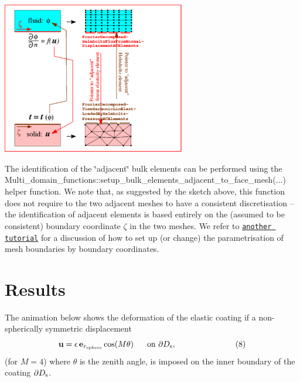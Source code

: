  
\begin{DoxyImage}
\includegraphics[width=0.6\textwidth]{multi_physics}
\end{DoxyImage}


The identification of the \char`\"{}adjacent\char`\"{} bulk elements can be performed using the {\ttfamily Multi\+\_\+domain\+\_\+functions\+::setup\+\_\+bulk\+\_\+elements\+\_\+adjacent\+\_\+to\+\_\+face\+\_\+mesh}(...) helper function. We note that, as suggested by the sketch above, this function does not require to the two adjacent meshes to have a consistent discretisation -- the identification of adjacent elements is based entirely on the (assumed to be consistent) boundary coordinate $ \zeta $ in the two meshes. We refer to \href{../../../poisson/fish_poisson2/html/index.html#boundary_coords}{\tt another tutorial} for a discussion of how to set up (or change) the parametrisation of mesh boundaries by boundary coordinates.



 

\hypertarget{index_results}{}\section{Results}\label{index_results}
The animation below shows the deformation of the elastic coating if a non-\/spherically symmetric displacement \[ \mbox{\bf u} = \epsilon \, \mbox{\bf e}_{r_{\rm sphere}} \cos (M\theta) \mbox{\ \ \ \ \ on $\partial D_{\rm s}$}, \ \ \ \ \ \ \ \ \ \ \ \ \ \ \ \ \ \ \ \ \ \ (8) \] (for $ M=4 $) where $ \theta $ is the zenith angle, is imposed on the inner boundary of the coating $\partial D_{\rm s}$.


